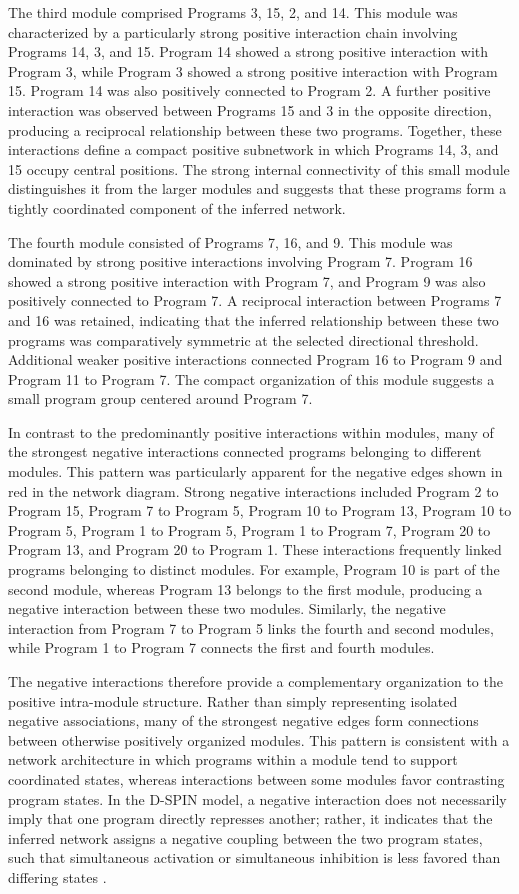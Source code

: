 \documentclass[11pt,a4paper]{article}
\begin{document}
The third module comprised Programs 3, 15, 2, and 14. This module was characterized by a particularly strong positive interaction chain involving Programs 14, 3, and 15. Program 14 showed a strong positive interaction with Program 3, while Program 3 showed a strong positive interaction with Program 15. Program 14 was also positively connected to Program 2. A further positive interaction was observed between Programs 15 and 3 in the opposite direction, producing a reciprocal relationship between these two programs. Together, these interactions define a compact positive subnetwork in which Programs 14, 3, and 15 occupy central positions. The strong internal connectivity of this small module distinguishes it from the larger modules and suggests that these programs form a tightly coordinated component of the inferred network.

The fourth module consisted of Programs 7, 16, and 9. This module was dominated by strong positive interactions involving Program 7. Program 16 showed a strong positive interaction with Program 7, and Program 9 was also positively connected to Program 7. A reciprocal interaction between Programs 7 and 16 was retained, indicating that the inferred relationship between these two programs was comparatively symmetric at the selected directional threshold. Additional weaker positive interactions connected Program 16 to Program 9 and Program 11 to Program 7. The compact organization of this module suggests a small program group centered around Program 7.

In contrast to the predominantly positive interactions within modules, many of the strongest negative interactions connected programs belonging to different modules. This pattern was particularly apparent for the negative edges shown in red in the network diagram. Strong negative interactions included Program 2 to Program 15, Program 7 to Program 5, Program 10 to Program 13, Program 10 to Program 5, Program 1 to Program 5, Program 1 to Program 7, Program 20 to Program 13, and Program 20 to Program 1. These interactions frequently linked programs belonging to distinct modules. For example, Program 10 is part of the second module, whereas Program 13 belongs to the first module, producing a negative interaction between these two modules. Similarly, the negative interaction from Program 7 to Program 5 links the fourth and second modules, while Program 1 to Program 7 connects the first and fourth modules.

The negative interactions therefore provide a complementary organization to the positive intra-module structure. Rather than simply representing isolated negative associations, many of the strongest negative edges form connections between otherwise positively organized modules. This pattern is consistent with a network architecture in which programs within a module tend to support coordinated states, whereas interactions between some modules favor contrasting program states. In the D-SPIN model, a negative interaction does not necessarily imply that one program directly represses another; rather, it indicates that the inferred network assigns a negative coupling between the two program states, such that simultaneous activation or simultaneous inhibition is less favored than differing states \cite{Jiang2023}.
\end{document}
